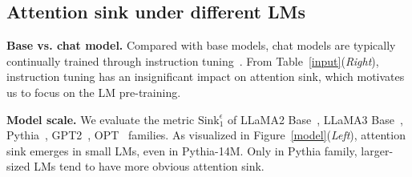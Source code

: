 \documentclass{article} \usepackage{iclr2025_conference,times}
\begin{document}
\vspace{-0.3cm}
\subsection{Attention sink under different LMs}\label{section3_4}
\vspace{-0.2cm}
\textbf{Base vs. chat model.} Compared with base models, chat models are typically continually trained through instruction tuning~\citep{ouyang2022training}. From Table~\ref{input}(\emph{Right}), instruction tuning has an insignificant impact on attention sink, which motivates us to focus on the LM pre-training.

\textbf{Model scale.} We evaluate the metric $\textrm{Sink}_1^{\epsilon}$ of LLaMA2 Base~\citep{touvron2023llama}, LLaMA3 Base~\citep{dubey2024llama}, Pythia~\citep{biderman2023pythia}, GPT2~\citep{radford2019language}, OPT~\citep{zhang2022opt} families. As visualized in Figure~\ref{model}(\emph{Left}), attention sink emerges in small LMs, even in Pythia-14M. Only in Pythia family, larger-sized LMs tend to have more obvious attention sink.
\end{document}
